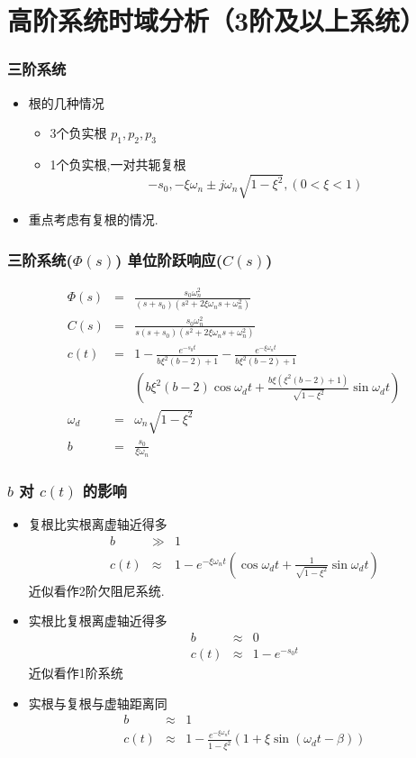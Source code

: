 \documentclass{beamer}
\begin{document}
\section{高阶系统时域分析（3阶及以上系统）}
\label{sec-4}
\begin{frame}
\frametitle{三阶系统}
\label{sec-4-1}

\begin{itemize}
\item <2-> 根的几种情况
\begin{itemize}
\item <3-> 3个负实根 $p_1,p_2,p_3$
\item <4-> 1个负实根,一对共轭复根 
      \[-s_0,-\xi\omega_n\pm j\omega_n\sqrt{1-\xi^2},(0<\xi<1)\]
\end{itemize}
\item <5-> 重点考虑有复根的情况.
\end{itemize}
\end{frame}
\begin{frame}
\frametitle{三阶系统($\Phi(s)$) 单位阶跃响应($C(s)$)}
\label{sec-4-2}

\begin{eqnarray*}
 \Phi(s) & = & \frac{s_0\omega_n^2}{(s+s_0)(s^2+2\xi\omega_n s+\omega_n^2)} \\
 C(s) &=& \frac{s_0\omega_n^2}{s(s+s_0)(s^2+2\xi\omega_n s+\omega_n^2)} \\
 c(t) &=& 1-\frac{e^{-s_0 t}}{b\xi^2(b-2)+1}-\frac{e^{-\xi\omega_n t}}{b\xi^2(b-2)+1} \\
     & & \left(b\xi^2(b-2)\cos\omega_d t + \frac{b\xi(\xi^2(b-2)+1)}{\sqrt{1-\xi^2}}\sin\omega_d t\right) \\
 \omega_d &=& \omega_n\sqrt{1-\xi^2} \\
 b &=& \frac{s_0}{\xi\omega_n}
\end{eqnarray*}
\end{frame}
\begin{frame}
\frametitle{$b$ 对 $c(t)$ 的影响}
\label{sec-4-3}


\begin{itemize}
\item <2->复根比实根离虚轴近得多
     \begin{eqnarray*}
     b & \gg & 1\\
     c(t) &\approx & 1-e^{-\xi\omega_n t}\left(\cos\omega_d t + \frac{1}{\sqrt{1-\xi^2}}\sin\omega_d t\right) 
     \end{eqnarray*}
     近似看作2阶欠阻尼系统.
\item <3->实根比复根离虚轴近得多
     \begin{eqnarray*}
     b & \approx & 0\\
     c(t) &\approx & 1-e^{-s_0 t}
     \end{eqnarray*}
     近似看作1阶系统
\item <4->实根与复根与虚轴距离同
     \begin{eqnarray*}
     b & \approx & 1\\
     c(t) &\approx & 1-\frac{e^{-\xi\omega_n t}}{1-\xi^2}\left(1+\xi\sin(\omega_d t-\beta)\right) 
     \end{eqnarray*}
\end{itemize}
\end{frame}
\end{document}
